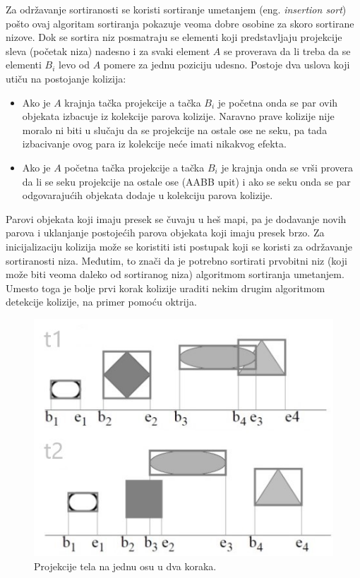 \documentclass[12pt,oneside]{memoir}
\begin{document}
Za održavanje sortiranosti se koristi sortiranje umetanjem (eng. {\em insertion sort}) 
pošto ovaj algoritam sortiranja pokazuje veoma dobre osobine za skoro sortirane nizove.
Dok se sortira niz posmatraju se elementi koji predstavljaju projekcije sleva (početak niza) nadesno i za svaki element $A$ se proverava da li treba da se elementi $B_i$ levo od $A$
pomere za jednu poziciju udesno. Postoje dva uslova koji utiču na postojanje kolizija:
\begin{itemize}  
	\item Ako je $A$ krajnja tačka projekcije a tačka $B_i$ je početna onda se par ovih objekata izbacuje iz kolekcije parova kolizije.
	Naravno prave kolizije nije moralo ni biti u slučaju da se projekcije na ostale ose ne seku, 
	pa tada izbacivanje ovog para iz kolekcije neće imati nikakvog efekta.
	\item Ako je $A$ početna tačka projekcije a tačka $B_i$ je krajnja onda se vrši provera da li se seku projekcije na ostale ose (AABB upit) i ako se seku
	onda se par odgovarajućih objekata dodaje u kolekciju parova kolizije.

\end{itemize}  

Parovi objekata koji imaju presek se čuvaju u heš mapi, pa je dodavanje novih parova i uklanjanje postojećih parova objekata koji imaju presek brzo.
Za inicijalizaciju kolizija može se koristiti isti postupak koji se koristi za održavanje sortiranosti niza.
Međutim, to znači da je potrebno sortirati prvobitni niz (koji može biti veoma daleko od sortiranog niza) algoritmom sortiranja umetanjem.
Umesto toga je bolje prvi korak kolizije uraditi nekim drugim algoritmom detekcije kolizije, na primer pomoću oktrija.

\begin{figure}[h!]
	\begin{center}
	\includegraphics[scale=0.8]{sap.jpg}
	\end{center}
	\caption{Projekcije tela na jednu osu u dva koraka.}
	\label{fig:sap}
\end{figure}
\end{document}
